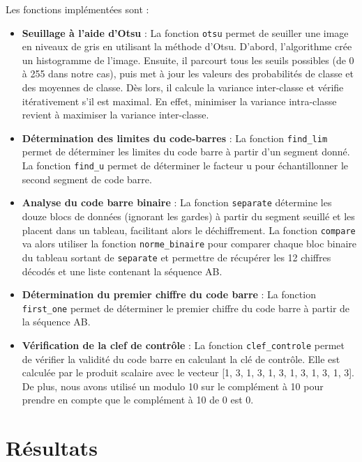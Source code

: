 \documentclass{rapport}
\begin{document}
\vspace{0.5cm}

Les fonctions implémentées sont :
\begin{itemize}
	\item \textbf{Seuillage à l'aide d'Otsu} : La fonction \texttt{otsu} permet de seuiller une image en niveaux de gris en utilisant la méthode d'Otsu.
	D'abord, l'algorithme crée un histogramme de l'image. Ensuite, il parcourt tous les seuils possibles (de 0 à 255 dans notre cas), puis met à jour les valeurs des probabilités de classe et des moyennes de classe. 
	Dès lors, il calcule la variance inter-classe et vérifie itérativement s'il est maximal. En effet, minimiser la variance intra-classe revient à maximiser la variance inter-classe.
	\item \textbf{Détermination des limites du code-barres} : La fonction \texttt{find\_lim} permet de déterminer les limites du code barre à partir d'un segment donné. 
	La fonction \texttt{find\_u} permet de déterminer le facteur u pour échantillonner le second segment de code barre.
	\item \textbf{Analyse du code barre binaire} : La fonction \texttt{separate} détermine les douze blocs de données (ignorant les gardes) à partir du segment seuillé et les placent dans un tableau, facilitant alors le déchiffrement. 
	La fonction \texttt{compare} va alors utiliser la fonction \texttt{norme\_binaire} pour comparer chaque bloc binaire du tableau sortant de \texttt{separate} et permettre de récupérer les 12 chiffres décodés et une liste contenant la séquence AB.
	\item \textbf{Détermination du premier chiffre du code barre} : La fonction \texttt{first\_one} permet de déterminer le premier chiffre du code barre à partir de la séquence AB.
	\item \textbf{Vérification de la clef de contrôle} : La fonction \texttt{clef\_controle} permet de vérifier la validité du code barre en calculant la clé de contrôle.
	Elle est calculée par le produit scalaire avec le vecteur [1, 3, 1, 3, 1, 3, 1, 3, 1, 3, 1, 3]. De plus, nous avons utilisé un modulo 10 sur le complément à 10 pour prendre en compte que le complément à 10 de 0 est 0.

\end{itemize}

\section{Résultats}
\end{document}
